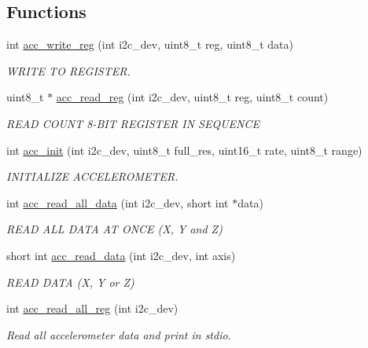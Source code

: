 \subsection*{Functions}
\begin{DoxyCompactItemize}
\item 
int \hyperlink{group__acc_ga534116416343122de29a5b6ade6876bd}{acc\-\_\-write\-\_\-reg} (int i2c\-\_\-dev, uint8\-\_\-t reg, uint8\-\_\-t data)
\begin{DoxyCompactList}\small\item\em W\-R\-I\-T\-E T\-O R\-E\-G\-I\-S\-T\-E\-R. \end{DoxyCompactList}\item 
uint8\-\_\-t $\ast$ \hyperlink{group__acc_ga2a91c44eebbe44f4d3b8c508633512f9}{acc\-\_\-read\-\_\-reg} (int i2c\-\_\-dev, uint8\-\_\-t reg, uint8\-\_\-t count)
\begin{DoxyCompactList}\small\item\em R\-E\-A\-D C\-O\-U\-N\-T 8-\/\-B\-I\-T R\-E\-G\-I\-S\-T\-E\-R I\-N S\-E\-Q\-U\-E\-N\-C\-E \end{DoxyCompactList}\item 
int \hyperlink{group__acc_gae8f9cc6e0d15e61039d846305f86f073}{acc\-\_\-init} (int i2c\-\_\-dev, uint8\-\_\-t full\-\_\-res, uint16\-\_\-t rate, uint8\-\_\-t range)
\begin{DoxyCompactList}\small\item\em I\-N\-I\-T\-I\-A\-L\-I\-Z\-E A\-C\-C\-E\-L\-E\-R\-O\-M\-E\-T\-E\-R. \end{DoxyCompactList}\item 
int \hyperlink{group__acc_ga013bb5ed8a763883fc440549d2b1a6ce}{acc\-\_\-read\-\_\-all\-\_\-data} (int i2c\-\_\-dev, short int $\ast$data)
\begin{DoxyCompactList}\small\item\em R\-E\-A\-D A\-L\-L D\-A\-T\-A A\-T O\-N\-C\-E (X, Y and Z) \end{DoxyCompactList}\item 
short int \hyperlink{group__acc_ga041d6953f2bfc8c5efa4d5bbac812305}{acc\-\_\-read\-\_\-data} (int i2c\-\_\-dev, int axis)
\begin{DoxyCompactList}\small\item\em R\-E\-A\-D D\-A\-T\-A (X, Y or Z) \end{DoxyCompactList}\item 
int \hyperlink{group__acc_ga8509cccabb08e7267677f66f25718731}{acc\-\_\-read\-\_\-all\-\_\-reg} (int i2c\-\_\-dev)
\begin{DoxyCompactList}\small\item\em Read all accelerometer data and print in stdio. \end{DoxyCompactList}\end{DoxyCompactItemize}


